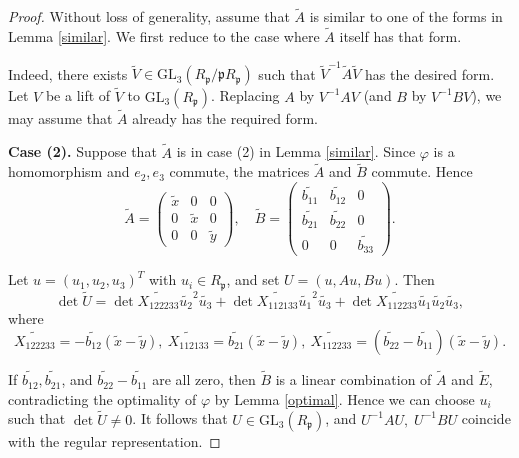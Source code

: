 \documentclass[10pt,a4paper]{amsart}
\begin{document}
\begin{proof}
Without loss of generality, assume that $\widetilde{A}$ is similar to one of the forms in Lemma \ref{similar}. We first reduce to the case where $\widetilde{A}$ itself has that form. 

Indeed, there exists $\widetilde{V} \in \mathrm{GL}_3(R_\mathfrak{p}/\mathfrak{p}R_\mathfrak{p})$ such that $\widetilde{V}^{-1}\widetilde{A}\widetilde{V}$ has the desired form. Let $V$ be a lift of $\widetilde{V}$ to $\mathrm{GL}_3(R_\mathfrak{p})$. Replacing $A$ by $V^{-1}AV$ (and $B$ by $V^{-1}BV$), we may assume that $\widetilde{A}$ already has the required form.

\medskip

\noindent
\textbf{Case (2).} Suppose that $\widetilde{A}$ is in case (2) in Lemma \ref{similar}. Since $\varphi$ is a homomorphism and $e_2,e_3$ commute, the matrices $\widetilde{A}$ and $\widetilde{B}$ commute. Hence
$$
\widetilde{A}=\begin{pmatrix}
\widetilde{x} & 0 & 0 \\
0 & \widetilde{x} & 0 \\
0 & 0 & \widetilde{y}
\end{pmatrix},
\quad
\widetilde{B}=\begin{pmatrix}
\widetilde{b_{11}} & \widetilde{b_{12}} & 0 \\
\widetilde{b_{21}} & \widetilde{b_{22}} & 0 \\
0 & 0 & \widetilde{b_{33}}
\end{pmatrix}.
$$

Let $u=(u_1,u_2,u_3)^T$ with $u_i \in R_\mathfrak{p}$, and set $U=(u,Au,Bu)$. Then
$$
\det \widetilde{U}
=\det \widetilde{X_{122233}}\widetilde{u_2}^2\widetilde{u_3}
+\det \widetilde{X_{112133}}\widetilde{u_1}^2\widetilde{u_3}
+\det \widetilde{X_{112233}}\widetilde{u_1}\widetilde{u_2}\widetilde{u_3},
$$
where
$$
\widetilde{X_{122233}}=-\widetilde{b_{12}}(\widetilde{x}-\widetilde{y}),\ 
\widetilde{X_{112133}}=\widetilde{b_{21}}(\widetilde{x}-\widetilde{y}),\ 
\widetilde{X_{112233}}=(\widetilde{b_{22}}-\widetilde{b_{11}})(\widetilde{x}-\widetilde{y}).
$$

If $\widetilde{b_{12}},\widetilde{b_{21}}$, and $\widetilde{b_{22}}-\widetilde{b_{11}}$ are all zero, then $\widetilde{B}$ is a linear combination of $\widetilde{A}$ and $\widetilde{E}$, contradicting the optimality of $\varphi$ by Lemma \ref{optimal}. Hence we can choose $u_i$ such that $\det \widetilde{U}\ne 0$. It follows that $U \in \mathrm{GL}_3(R_\mathfrak{p})$, and $U^{-1}AU,\; U^{-1}BU$ coincide with the regular representation.


\end{proof}
\end{document}
